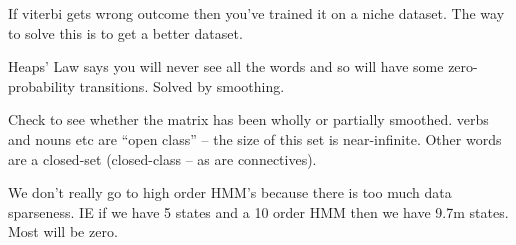 \documentclass[10pt,\jkfside,a4paper]{article}
\begin{document}
If viterbi gets wrong outcome then you've trained it on a niche dataset. The way to solve this is to 
get a better dataset.

Heaps' Law says you will never see all the words and so will have some zero-probability 
transitions. Solved by smoothing.

Check to see whether the matrix has been wholly or partially smoothed. 
verbs and nouns etc are ``open class'' -- the size of this set is near-infinite. 
Other words are a closed-set (closed-class -- as are connectives).

We don't really go to high order HMM's because there is too much data sparseness. IE 
if we have 5 states and a 10 order HMM then we have 9.7m states. Most will be zero.
\end{document}
